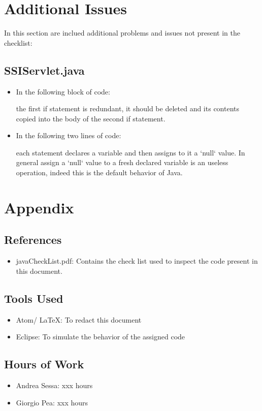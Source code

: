 \documentclass[11pt,titlepage]{article} %
\begin{document}
\section{Additional Issues}
  In this section are inclued additional problems and issues not present in the checklist:
  \subsection{SSIServlet.java}
    \begin{itemize}
      \item In the following block of code:
	
	the first if statement is redundant, it should be deleted and its contents copied into the body of the second if statement.
      \item In the following two lines of code:
	
	each statement declares a variable and then assigns to it a `null` value. In general assign a `null` value to a fresh declared
	variable is an useless operation, indeed this is the default behavior of Java.  
    \end{itemize}
\newpage
\section{Appendix}
\subsection{References}
   \begin{itemize}
    \item javaCheckList.pdf: Contains the check list used to inspect the code present in this document.
   \end{itemize}
\subsection{Tools Used}
  \begin{itemize}
   \item Atom/ \LaTeX: To redact this document
   \item Eclipse: To simulate the behavior of the assigned code
  \end{itemize}
\subsection{Hours of Work}
  \begin{itemize}
   \item Andrea Sessa: xxx hours
   \item Giorgio Pea: xxx hours
  \end{itemize}
\end{document}
